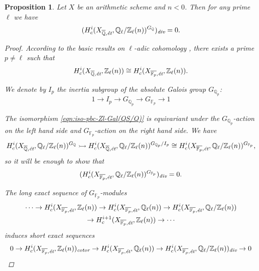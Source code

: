 \documentclass[leqno,12pt]{article}
\theoremstyle{plain}
\newtheorem{proposition}[theorem]{\indent\sc Proposition}
\theoremstyle{definition}
\newcommand{\FF}{\mathbb{F}}
\newcommand{\QQ}{\mathbb{Q}}
\newcommand{\ZZ}{\mathbb{Z}}
\renewcommand{\div}{\text{\it div}}
\newcommand{\cotor}{\text{\it cotor}}
\begin{document}
\begin{proposition}
  \label{prop:l-adic-cohomology-key-lemma}
  Let $X$ be an arithmetic scheme and $n < 0$. Then for any prime $\ell$ we have
  $$(H^i_c (X_{\overline{\QQ},\text{\it \'{e}t}}, \QQ_\ell/\ZZ_\ell (n))^{G_\QQ})_\div = 0.$$

  \begin{proof}
    According to the basic results on $\ell$-adic cohomology
    \cite[Expos\'{e}~VI]{SGA5}, there exists a prime $p \ne \ell$ such that
    \begin{equation}
      \label{eqn:iso-pbc-Zl-Gal(QS/Q)}
      H^i_c (X_{\overline{\QQ}, \text{\it \'{e}t}}, \ZZ_\ell (n)) \cong H^i_c (X_{\overline{\FF_p}, \text{\it \'{e}t}}, \ZZ_\ell (n)).
    \end{equation}

    We denote by $I_p$ the inertia subgroup of the absolute Galois group
    $G_{\QQ_p}$:
    $$1 \to I_p \to G_{\QQ_p} \to G_{\FF_p} \to 1$$

    The isomorphism \eqref{eqn:iso-pbc-Zl-Gal(QS/Q)} is equivariant under the
    $G_{\QQ_p}$-action on the left hand side and $G_{\FF_p}$-action on the right
    hand side. We have
    \[ H^i_c (X_{\overline{\QQ}, \text{\it \'{e}t}}, \QQ_\ell/\ZZ_\ell (n))^{G_\QQ} \rightarrowtail
    H^i_c (X_{\overline{\QQ}, \text{\it \'{e}t}}, \QQ_\ell/\ZZ_\ell (n))^{G_{\QQ_p}/I_p}
    \cong H^i_c (X_{\overline{\FF_p}, \text{\it \'{e}t}}, \QQ_\ell/\ZZ_\ell (n))^{G_{\FF_p}}, \]
    so it will be enough to show that
    $$(H^i_c (X_{\overline{\FF_p},\text{\it \'{e}t}}, \QQ_\ell/\ZZ_\ell (n))^{G_{\FF_p}})_\div = 0.$$

    The long exact sequence of $G_{\FF_p}$-modules
    \begin{multline*}
      \cdots \to
      H^i_c (X_{\overline{\FF_p},\text{\it \'{e}t}}, \ZZ_\ell (n)) \to
      H^i_c (X_{\overline{\FF_p},\text{\it \'{e}t}}, \QQ_\ell (n)) \to
      H^i_c (X_{\overline{\FF_p},\text{\it \'{e}t}}, \QQ_\ell/\ZZ_\ell (n)) \\
      \to H^{i+1}_c (X_{\overline{\FF_p},\text{\it \'{e}t}}, \ZZ_\ell (n)) \to
      \cdots
    \end{multline*}
    induces short exact sequences
    \begin{equation}
      \label{eqn:Zl-Ql-Ql/Zl-ses}
      0 \to H^i_c (X_{\overline{\FF_p},\text{\it \'{e}t}}, \ZZ_\ell (n))_\cotor \to
      H^i_c (X_{\overline{\FF_p},\text{\it \'{e}t}}, \QQ_\ell (n)) \to
      H^i_c (X_{\overline{\FF_p},\text{\it \'{e}t}}, \QQ_\ell/\ZZ_\ell (n))_\div \to 0
    \end{equation}


\end{proof}
\end{proposition}
\end{document}
